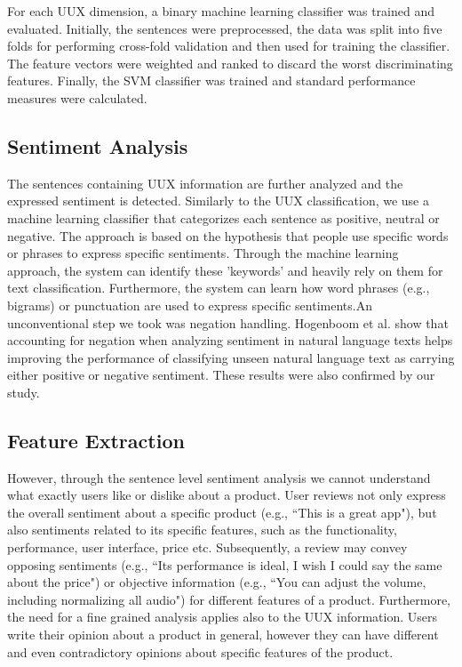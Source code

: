 For each UUX dimension, a binary machine learning classifier was trained and evaluated. Initially, the sentences were preprocessed, the data was split into five folds for performing cross-fold validation and then used for training the classifier. The feature vectors were weighted and ranked to discard the worst discriminating features. Finally, the SVM classifier was trained and standard performance measures were calculated.

\subsection{Sentiment Analysis}

The sentences containing UUX information are further analyzed and the expressed sentiment is detected. Similarly to the UUX classification, we use a machine learning classifier that categorizes each sentence as positive, neutral or negative. The approach is based on the hypothesis that people use specific words or phrases to express specific sentiments. Through the machine learning approach, the system can identify these 'keywords' and heavily rely on them for text classification. Furthermore, the system can learn how word phrases (e.g., bigrams) or punctuation are used to express specific sentiments.An unconventional step we took was negation handling. Hogenboom et al. \cite{Hogenboom2011} show that accounting for negation when analyzing sentiment in natural language texts helps improving the performance of classifying unseen natural language text as carrying either positive or negative sentiment. These results were also confirmed by our study. 

\subsection{Feature Extraction}

However, through the sentence level sentiment analysis we cannot understand what exactly users like or dislike about a product. User reviews not only express the overall sentiment about a specific product (e.g., ``This is a great  app"), but also sentiments related to its specific features, such as the functionality, performance, user interface, price etc. Subsequently, a review may convey opposing sentiments (e.g., ``Its performance is ideal, I wish I could say the same about the price") or objective information (e.g., ``You can adjust the volume, including normalizing all audio") for different features of a product.
Furthermore, the need for a fine grained analysis applies also to the UUX information. Users write their opinion about a product in general, however they can have different and even contradictory opinions about specific features of the product. 

